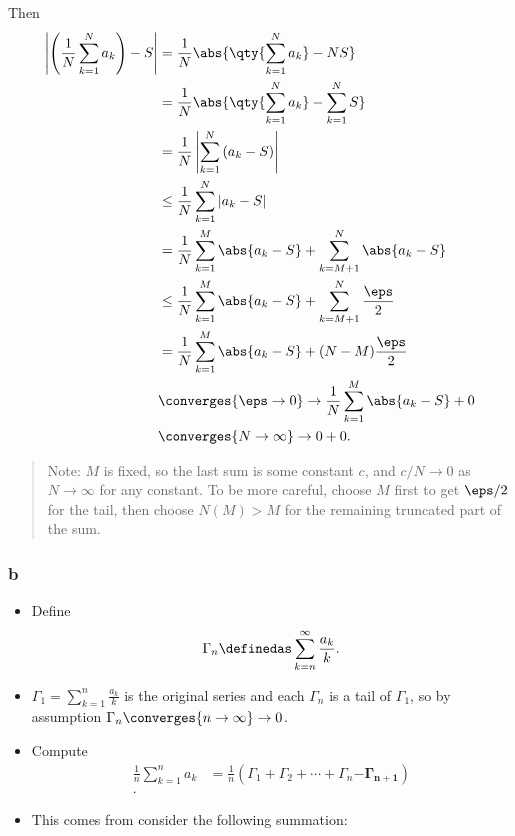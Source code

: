 \begin{solution}
Then
\begin{align*}
\left|\left(\frac{1}{N} \sum_{k=1}^{N} a_{k}\right)-S\right| 
&= {1\over N} \abs{ \qty{\sum_{k=1}^N a_k} - NS  } \\
&= {1\over N} \abs{ \qty{\sum_{k=1}^N a_k} - \sum_{k=1}^N S  } \\
&=\frac{1}{N}\left|\sum_{k=1}^{N}\left(a_{k}-S\right)\right| \\
&\leq \frac{1}{N} \sum_{k=1}^{N}\left|a_{k}-S\right| \\
&= {1\over N} \sum_{k=1}^M \abs{a_k - S} + \sum_{k=M+1}^N \abs{a_k - S} \\
&\leq {1\over N} \sum_{k=1}^M \abs{a_k - S} + \sum_{k=M+1}^N {\eps \over 2} \\
&= {1\over N} \sum_{k=1}^M \abs{a_k - S} + (N - M){\eps \over 2} \\
&\converges{\eps\to 0}\to {1\over N} \sum_{k=1}^M \abs{a_k - S} + 0 \\
&\converges{N\to \infty}\to 0 + 0
.\end{align*}

\begin{quote}
Note: \(M\) is fixed, so the last sum is some constant \(c\), and
\(c/N \to 0\) as \(N\to\infty\) for any constant. To be more careful,
choose \(M\) first to get \(\eps/2\) for the tail, then choose
\(N(M)>M\) for the remaining truncated part of the sum.
\end{quote}

\hypertarget{b-1}{%
\subsubsection{b}\label{b-1}}

\begin{itemize}
\item
  Define
  \begin{align*}
  \Gamma_n \definedas \sum_{k=n}^\infty \frac{a_k}{k}
  .\end{align*}
\item
  \(\Gamma_1 = \sum_{k=1}^n \frac{ a_k } k\) is the original series and
  each \(\Gamma_n\) is a tail of \(\Gamma_1\), so by assumption
  \(\Gamma_n \converges{n\to\infty}\to 0\).
\item
  Compute
  \begin{align*}
  \frac 1 n \sum_{k=1}^n a_k 
  &= \frac 1 n (\Gamma_1 + \Gamma_2 + \cdots + \Gamma_{n} \mathbf{- \Gamma_{n+1}}) \\
  .\end{align*}
\item
  This comes from consider the following summation:


\end{itemize}
\end{solution}
